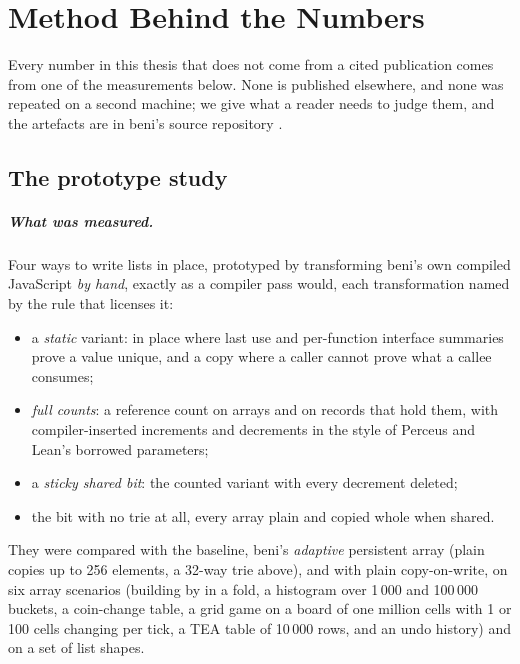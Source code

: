 \chapter{Method Behind the Numbers}
\label{app:method}

Every number in this thesis that does not come from a cited publication comes from one of the
measurements below. None is published elsewhere, and none was repeated on a second machine; we give
what a reader needs to judge them, and the artefacts are in beni's source repository
\citep{beni2026}.

\section{The prototype study}

\paragraph{What was measured.} Four ways to write lists in place, prototyped by transforming beni's own
compiled JavaScript \emph{by hand}, exactly as a compiler pass would, each transformation named by the
rule that licenses it:
\begin{itemize}
\item a \emph{static} variant: in place where last use and per-function interface summaries prove a value
unique, and a copy where a caller cannot prove what a callee consumes;
\item \emph{full counts}: a reference count on arrays and on records that hold them, with compiler-inserted
increments and decrements in the style of Perceus and Lean's borrowed parameters;
\item a \emph{sticky shared bit}: the counted variant with every decrement deleted;
\item the bit with no trie at all, every array plain and copied whole when shared.
\end{itemize}
They were compared with the baseline, beni's \emph{adaptive} persistent array (plain copies up to 256
elements, a 32-way trie above), and with plain copy-on-write, on six array scenarios (building by
 in a fold, a histogram over 1\,000 and 100\,000 buckets, a coin-change table, a grid game on
a board of one million cells with 1 or 100 cells changing per tick, a TEA table of 10\,000 rows, and an
undo history) and on a set of list shapes.

